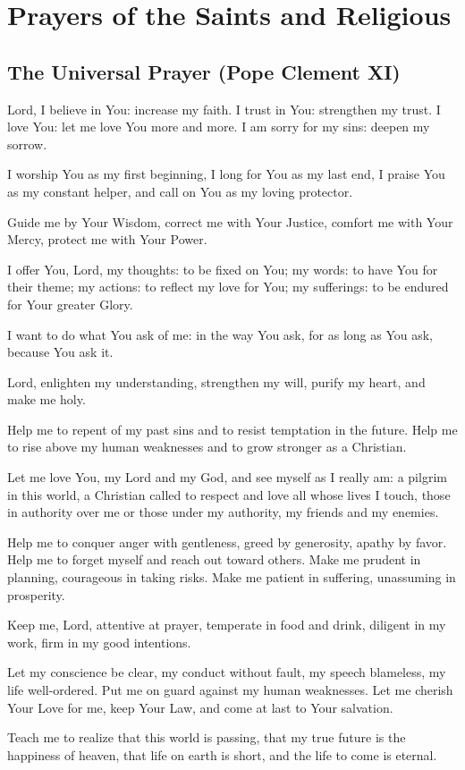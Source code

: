 \documentclass[12pt]{article}
\newcommand{\prayersection}[1]{\section{#1}}
\newcommand{\prayertitle}[1]{\subsection{#1}}
\begin{document}
\newpage

\prayersection{Prayers of the Saints and Religious}
\prayertitle{The Universal Prayer (Pope Clement XI)}
Lord, I believe in You: increase my faith.
I  trust in You: strengthen my trust.
I love You: let me love You more and more.
I am sorry for my sins: deepen my sorrow.

I worship You as my first beginning, I long for You as my last end, I praise You as my constant helper, and call on You as my loving protector.

Guide me by Your Wisdom,
correct me with Your Justice,
comfort me with Your Mercy,
protect me with Your Power.

I offer You, Lord, my thoughts: to be fixed on You;
my words: to have You for their theme;
my actions: to reflect my love for You;
my sufferings: to be endured for Your greater Glory.

I want to do what You ask of me:
in the way You ask,
for as long as You ask,
because You ask it.

Lord, enlighten my understanding,
strengthen my will,
purify my heart,
and make me holy.

Help me to repent of my past sins and to resist temptation in the future.
Help me to rise above my human weaknesses and to grow stronger as a Christian.

Let me love You, my Lord and my God, and see myself as I really am:
a pilgrim in this world,
a Christian called to respect and love all whose lives I touch,
those in authority over me or those under my authority,
my friends and my enemies.

Help me to conquer anger with gentleness,
greed by generosity,
apathy by favor.
Help me to forget myself and reach out toward others.
Make me prudent in planning, courageous in taking risks.
Make me patient in suffering, unassuming in prosperity.

Keep me, Lord, attentive at prayer,
temperate in food and drink,
diligent in my work,
firm in my good intentions.

Let my conscience be clear,
my conduct without fault,
my speech blameless,
my life well-ordered.
Put me on guard against my human weaknesses.
Let me cherish Your Love for me,
keep Your Law,
and come at last to Your salvation.

Teach me to realize that this world is passing,
that my true future is the happiness of heaven,
that life on earth is short,
and the life to come is eternal.
\end{document}
